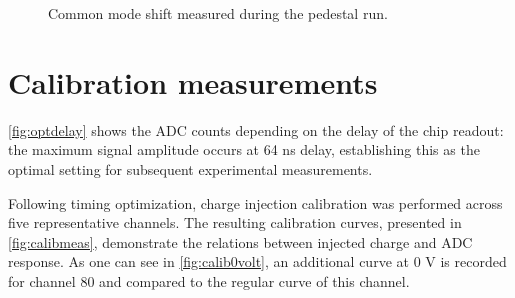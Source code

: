 \begin{figure}[H]
	\centering
	\caption{Common mode shift measured during the pedestal run.}
	\label{fig:shift}
\end{figure}
\section{Calibration measurements}

\autoref{fig:optdelay} shows the ADC counts depending on the delay of the chip readout: the maximum signal amplitude occurs at 64 ns delay, establishing this as the optimal setting for subsequent experimental measurements. 

Following timing optimization, charge injection calibration was performed across five representative channels. The resulting calibration curves, presented in \autoref{fig:calibmeas}, demonstrate the relations between injected charge and ADC response. As one can see in \autoref{fig:calib0volt}, an additional curve at 0 V is recorded for channel 80 and compared to the regular curve of this channel.

